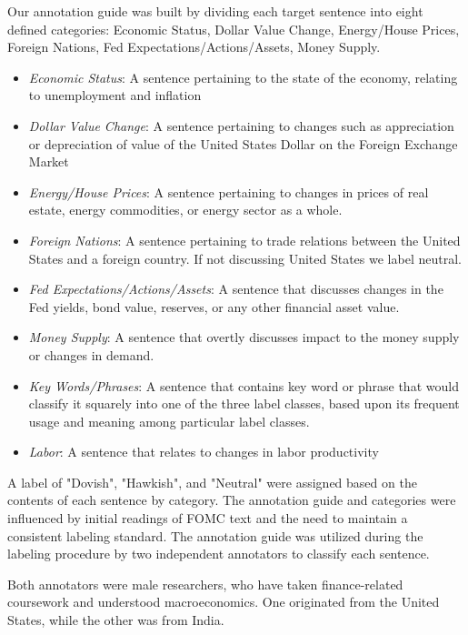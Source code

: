 \documentclass[11pt]{article}
\begin{document}
Our annotation guide was built by dividing each target sentence into eight defined categories: Economic Status, Dollar Value Change, Energy/House Prices, Foreign Nations, Fed Expectations/Actions/Assets, Money Supply.
\begin{itemize}
    \item \emph{Economic Status}: A sentence pertaining to the state of the economy, relating to unemployment and inflation
    \item \emph{Dollar Value Change}: A sentence pertaining to changes such as appreciation or depreciation of value of the United States Dollar on the Foreign Exchange Market
    \item \emph{Energy/House Prices}: A sentence pertaining to changes in prices of real estate, energy commodities, or energy sector as a whole.
    \item \emph{Foreign Nations}: A sentence pertaining to trade relations between the United States and a foreign country. If not discussing United States we label neutral.
    \item \emph{Fed Expectations/Actions/Assets}: A sentence that discusses changes in the Fed yields, bond value, reserves, or any other financial asset value. 
    \item \emph{Money Supply}: A sentence that overtly discusses impact to the money supply or changes in demand.
    \item \emph{Key Words/Phrases}: A sentence that contains key word or phrase that would classify it squarely into one of the three label classes, based upon its frequent usage and meaning among particular label classes.
    \item \emph{Labor}: A sentence that relates to changes in labor productivity

\end{itemize}

A label of "Dovish", "Hawkish", and "Neutral" were assigned based on the contents of each sentence by category. The annotation guide and categories were influenced by initial readings of FOMC text and the need to maintain a consistent labeling standard. The annotation guide was utilized during the labeling procedure by two independent annotators to classify each sentence.

Both annotators were male researchers, who have taken finance-related coursework and understood macroeconomics. One originated from the United States, while the other was from India.


\label{sec:appendix_manual_ann}
\end{document}
